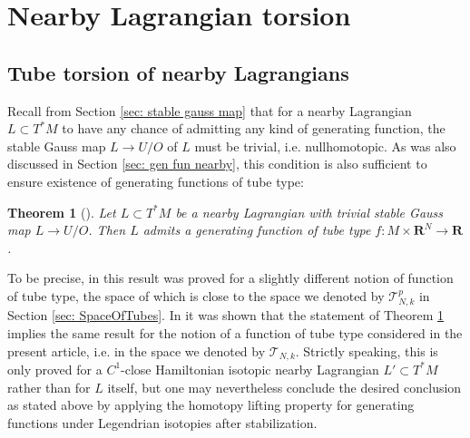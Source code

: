 \documentclass{amsart}
\newcommand\cT{\mathcal{T}}
\def\bC{\mathbf{C}}
\def\bR{\mathbf{R}}
\newtheorem{theorem}{Theorem}[section]
\theoremstyle{definition}
\theoremstyle{remark}
\newtheorem{inductive lemma}[theorem]{Inductive Lemma}
\begin{document}
\section{Nearby Lagrangian torsion}\label{sec: nearby}


\subsection{Tube torsion of nearby Lagrangians}

Recall from Section \ref{sec: stable gauss map} that for a nearby Lagrangian $L \subset T^*M$ to have any chance of admitting any kind of generating function, the stable Gauss map $L \to U/O$ of $L$ must be trivial, i.e. nullhomotopic. As was also discussed in Section \ref{sec: gen fun nearby}, this condition is also sufficient to ensure existence of generating functions of tube type: 


\begin{theorem}[\cite{ACGK}]\label{thm: exist for stat triv}
Let $L \subset T^*M$ be a nearby Lagrangian with trivial stable Gauss map $L \to U/O$. Then $L$ admits a generating function of tube type $f:M \times \bR^N \to \bR$.\end{theorem} 

To be precise, in \cite{ACGK} this result was proved for a slightly different notion of function of tube type, the space of which is close to the space we denoted by $\cT_{N,k}^p$ in Section \ref{sec: SpaceOfTubes}. In \cite{AACK} it was shown that the statement of Theorem \ref{thm: exist for stat triv} implies the same result for the notion of a function of tube type considered in the present article, i.e. in the space we denoted by $\cT_{N,k}$. Strictly speaking, this is only proved for a $C^1$-close Hamiltonian isotopic nearby Lagrangian $L' \subset T^*M$ rather than for $L$ itself, but one may nevertheless conclude the desired conclusion as stated above by applying the homotopy lifting property for generating functions under Legendrian isotopies after stabilization. 
\end{document}
